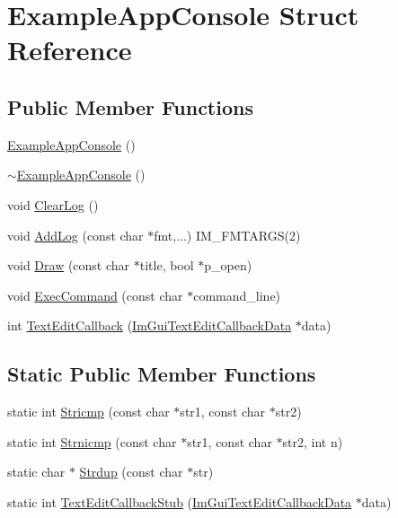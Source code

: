 \hypertarget{struct_example_app_console}{}\section{Example\+App\+Console Struct Reference}
\label{struct_example_app_console}
\subsection*{Public Member Functions}
\begin{DoxyCompactItemize}
\item 
\hyperlink{struct_example_app_console_a405521e6aa8f97954b67315baf8d6147}{Example\+App\+Console} ()
\item 
\hyperlink{struct_example_app_console_a91ef200056f867cf97a57db91bb991c4}{$\sim$\+Example\+App\+Console} ()
\item 
void \hyperlink{struct_example_app_console_a2ef13f00c474b16b8da2ec062d5e5cc2}{Clear\+Log} ()
\item 
void \hyperlink{struct_example_app_console_a719354ce6be7481923a5fd702e785952}{Add\+Log} (const char $\ast$fmt,...) I\+M\+\_\+\+F\+M\+T\+A\+R\+GS(2)
\item 
void \hyperlink{struct_example_app_console_a0518a09c7e8648dd52c7c06df19ac17a}{Draw} (const char $\ast$title, bool $\ast$p\+\_\+open)
\item 
void \hyperlink{struct_example_app_console_aa1e8bf1f3795cbc41597e1ff081c6589}{Exec\+Command} (const char $\ast$command\+\_\+line)
\item 
int \hyperlink{struct_example_app_console_aae97c81ddab660e6e0296c21844c4a7b}{Text\+Edit\+Callback} (\hyperlink{struct_im_gui_text_edit_callback_data}{Im\+Gui\+Text\+Edit\+Callback\+Data} $\ast$data)
\end{DoxyCompactItemize}
\subsection*{Static Public Member Functions}
\begin{DoxyCompactItemize}
\item 
static int \hyperlink{struct_example_app_console_a6e5e5d66e77618eff0f89785261c9391}{Stricmp} (const char $\ast$str1, const char $\ast$str2)
\item 
static int \hyperlink{struct_example_app_console_a11bcb7a4b801e5eeb0c098c082fedc25}{Strnicmp} (const char $\ast$str1, const char $\ast$str2, int n)
\item 
static char $\ast$ \hyperlink{struct_example_app_console_a61d0da41ef31ea8690b23681a1e54dba}{Strdup} (const char $\ast$str)
\item 
static int \hyperlink{struct_example_app_console_a722d9b5dc6df127f27c83afeee29bfd3}{Text\+Edit\+Callback\+Stub} (\hyperlink{struct_im_gui_text_edit_callback_data}{Im\+Gui\+Text\+Edit\+Callback\+Data} $\ast$data)
\end{DoxyCompactItemize}
